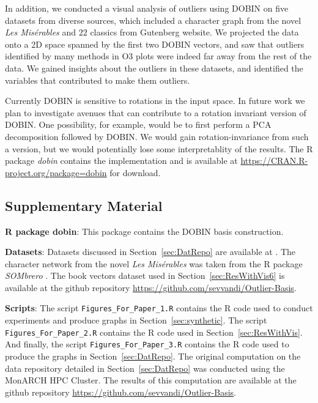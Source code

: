 \documentclass[letter,12pt]{article}
\begin{document}
In addition, we conducted a visual analysis of outliers using DOBIN on five datasets from diverse sources, which included a character graph from the novel \textit{Les Mis\'erables} and $22$ classics from Gutenberg website. We projected the data onto a 2D space spanned by the first two DOBIN vectors, and saw that outliers identified by many methods in O3 plots were indeed far away from the rest of the data. We gained insights about the outliers in these datasets, and identified the variables that contributed to make them outliers.


Currently DOBIN is sensitive to rotations in the input space. In future work we plan to investigate avenues that can contribute to a rotation invariant version of DOBIN. One possibility, for example, would be to first perform a PCA decomposition followed by DOBIN. We would gain rotation-invariance from such a version, but we would potentially lose some interpretablity of the results. The R package \textit{dobin} contains the implementation and is available at \url{https://CRAN.R-project.org/package=dobin} for download.

\clearpage

\subsection*{Supplementary Material}

\textbf{R package dobin}: This package contains the DOBIN basis construction.

\textbf{Datasets}: Datasets discussed in Section~\ref{sec:DatRepo} are available at \cite{datasets}. The character network from the novel \textit{Les Mis\'erables} was taken from the R package \textit{SOMbrero} \citep{sombrero}. The book vectors dataset used in Section~\ref{sec:ResWithVis6} is available at the github repository \url{https://github.com/sevvandi/Outlier-Basis}.

\textbf{Scripts}: The script \texttt{Figures\_For\_Paper\_1.R} contains the R code used to conduct experiments and produce graphs in Section~\ref{sec:synthetic}. The script \texttt{Figures\_For\_Paper\_2.R} contains the R code used in Section~\ref{sec:ResWithVis}. And finally, the script \texttt{Figures\_For\_Paper\_3.R} contains the R code used to produce the graphs in Section~\ref{sec:DatRepo}. The original computation on the data repository detailed in Section~\ref{sec:DatRepo} was conducted using the MonARCH HPC Cluster. The results of this computation are available at the github repository \url{https://github.com/sevvandi/Outlier-Basis}.
\end{document}
